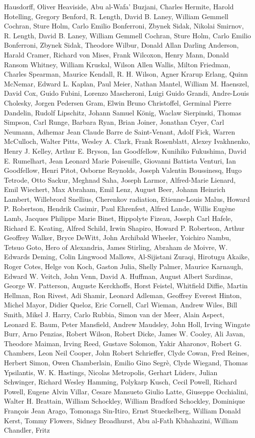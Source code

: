 \begin{spacing}{0.5}
\begin{tiny}
Hausdorff, Oliver Heaviside, Abu al-Wafa' Buzjani, Charles Hermite, Harold Hotelling, Gregory Benford, R. Length, David B. Laney, William Gemmell Cochran, Sture Holm, Carlo Emilio Bonferroni, Zbynek Sidak, Nikolai Smirnov, R. Length, David B. Laney, William Gemmell Cochran, Sture Holm, Carlo Emilio Bonferroni, Zbynek Sidak, Theodore Wilbur, Donald Allan Darling Anderson, Harald Cramer, Richard von Mises, Frank Wilcoxon, Henry Mann, Donald Ransom Whitney, William Kruskal, Wilson Allen Wallis, Milton Friedman, Charles Spearman, Maurice Kendall, R. H. Wilson, Agner Krarup Erlang, Quinn McNemar, Edward L. Kaplan, Paul Meier, Nathan Mantel, William M. Haenszel, David Cox, Guido Fubini, Lorenzo Mascheroni, Luigi Guido Grandi, Andre-Louis Cholesky, Jorgen Pedersen Gram, Elwin Bruno Christoffel, Germinal Pierre Dandelin, Rudolf Lipschitz, Johann Samuel König, Waclaw Sierpinski, Thomas Simpson, Carl Runge, Barbara Ryan, Brian Joiner, Jonathan Cryer, Carl Neumann, Adhemar Jean Claude Barre de Saint-Venant, Adolf Fick, Warren McCulloch, Walter Pitts, Wesley A. Clark, Frank Rosenblatt, Alexey Ivakhnenko, Henry J. Kelley, Arthur E. Bryson, Ian Goodfellow, Kunihiko Fukushima, David E. Rumelhart, Jean Leonard Marie Poiseuille, Giovanni Battista Venturi, Ian Goodfellow, Henri Pitot, Osborne Reynolds, Joseph Valentin Boussinesq, Hugo Tetrode, Otto Sackur, Meghnad Saha, Joseph Larmor, Alfred-Marie Lienard, Emil Wiechert, Max Abraham, Emil Lenz, August Beer, Johann Heinrich Lambert, Willebrord Snellius, Cherenkov radiation, Etienne-Louis Malus, Howard P. Robertson, Hendrik Casimir, Paul Ehrenfest, Alfred Lande, Willis Eugène Lamb, Jacques Philippe Marie Binet, Hippolyte Fizeau, Joseph Carl Hafele, Richard E. Keating, Alfred Schild, Irwin Shapiro, Howard P. Robertson, Arthur Geoffrey Walker, Bryce DeWitt, John Archibald Wheeler, Yoichiro Nambu, Tetsuo Goto, Hero of Alexandria, James Stirling, Abraham de Moivre, W. Edwards Deming, Colin Lingwood Mallows, Al-Sijistani Zuraqi, Hirotugu Akaike, Roger Cotes, Helge von Koch, Gaston Julia, Shelly Palmer, Maurice Karnaugh, Edward W. Veitch, John Venn, David A. Huffman, August Albert Sardinas, George W. Patterson, Auguste Kerckhoffs, Horst Feistel, Whitfield Diffie, Martin Hellman, Ron Rivest, Adi Shamir, Leonard Adleman, Geoffrey Everest Hinton, Michel Mayor, Didier Queloz, Eric Cornell, Carl Wieman, Andrew Wiles, Bill Smith, Mikel J. Harry, Carlo Rubbia, Simon van der Meer, Alain Aspect, Leonard E. Baum, Peter Mansfield, Andrew Maudsley, John Holl, Irving Wingate Burr, Arno Penzias, Robert Wilson, Robert Dicke, James W. Cooley, Ali Javan, Theodore Maiman, Irving Reed, Gustave Solomon, Yakir Aharonov, Robert G. Chambers, Leon Neil Cooper, John Robert Schrieffer, Clyde Cowan, Fred Reines, Herbert Simon,  Owen Chamberlain, Emilio Gino Segrè, Clyde Wiegand,  Thomas Ypsilantis, W. K. Hastings, Nicolas Metropolis, Gerhart Lüders, Julian Schwinger, Richard Wesley Hamming, Polykarp Kusch, Cecil Powell, Richard Powell, Eugene Alvin Villar, Cesare Mansueto Giulio Latte, Giuseppe Occhialini, Walter H. Brattain, William Schockley, William Bradford Schockley, Dominique François Jean Arago, Tomonaga Sin-Itiro, Ernst Stueckelberg, William Donald Kerst, Tommy Flowers, Sidney Broadhurst, Abu al-Fath Kbhahazini, William Chandler, Fritz 
\end{tiny}
\end{spacing}
